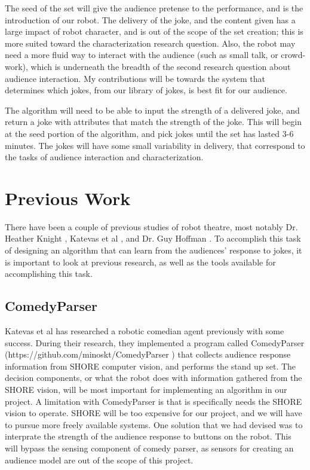 \documentclass[onecolumn, draftclsnofoot,10pt, compsoc]{IEEEtran}
\begin{document}
The seed of the set will give the audience pretense to the performance, and is the introduction of our robot. The delivery of the joke, and the content given has a large impact of robot character, and is out of the scope of the set creation; this is more suited toward the characterization research question. Also, the robot may need a more fluid way to interact with the audience (such as small talk, or crowd-work), which is underneath the breadth of the second research question about audience interaction. My contributions will be towards the system that determines which jokes, from our library of jokes, is best fit for our audience.

The algorithm will need to be able to input the strength of a delivered joke, and return a joke with attributes that match the strength of the joke. This will begin at the seed portion of the algorithm, and pick jokes until the set has lasted 3-6 minutes. The jokes will have some small variability in delivery, that correspond to the tasks of audience interaction and characterization.

\section{Previous Work}
    There have been a couple of previous studies of robot theatre, most notably Dr. Heather Knight \cite{KnightEightLessons:2011}, Katevas et al \cite{KatevasRobot:2014}, and Dr. Guy Hoffman \cite{hoffman2010anticipation}. To accomplish this task of designing an algorithm that can learn from the audiences' response to jokes, it is important to look at previous research, as well as the tools available for accomplishing this task.
  \subsection{ComedyParser}
  Katevas et al \cite{KatevasRobot:2014} has researched a robotic comedian agent previously with some success. During their research, they implemented a program called ComedyParser (https://github.com/minoskt/ComedyParser ) that collects audience response information from SHORE computer vision, and performs the stand up set. The decision components, or what the robot does with information gathered from the SHORE vision, will be most important for implementing an algorithm in our project. 
  A limitation with ComedyParser is that is specifically needs the SHORE vision to operate. SHORE will be too expensive for our project, and we will have to pursue more freely available systems. One solution that we had devised was to interprate the strength of the audience response to buttons on the robot. This will bypass the sensing component of comedy parser, as sensors for creating an audience model are out of the scope of this project.
\end{document}
